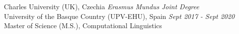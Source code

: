 
{Charles University (UK)}, Czechia \hfill
        {\textit{Erasmus Mundus Joint Degree}}\\
{University of the Basque Country (UPV-EHU), Spain} \hfill
    {\textit{Sept 2017 - Sept 2020}}\\
        Master of Science (M.S.), Computational Linguistics